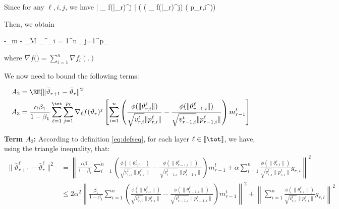 \documentclass{article}
\begin{document}
Since for any $\ell, i , j$, we have
\beq
  \EE{} \leq   \left| \nabla_{\ell} f(\bar{\vartheta}_r)^j \right| \left( \sign(  \nabla_{\ell} f(\bar{\vartheta}_r)^j) \neq  \sign( p_{r,i}^{\ell})\right) 
\eeq

Then, we obtain

\beq
\EE[A_1]  \leq -\alpha \phi_m     -  \alpha \phi_M \sum_{}^\tot \sum_{i = 1}^n \sum_{j=1}^{p_\ell} 
\eeq

where $\overline{\nabla f}(\dot) = \sum_{i=1}^n \nabla f_i(.)$

We now need to bound the following terms:

\begin{align}
& A_2 = \EE[  \| \bar{\vartheta}_{r+1} - \bar{\vartheta}_r \|^2]\\
& A_3 =  \frac{\alpha \beta_1}{1-\beta_1}  \sum_{\ell=1}^\tot \sum_{j=1}^{p_\ell} \nabla_{\ell} f(\bar{\vartheta}_r)^j \left[   \sum_{i = 1}^n  \left( \frac{\phi(\|\theta_{r,i}^{\ell}\|)}{\sqrt{v^{t}_{r,i}} \|p_{r,i}^{\ell}\|} - \frac{\phi(\|\theta_{r-1,i}^{\ell}\|)}{\sqrt{v^{t}_{r-1,i}} \|p_{r-1,i}^{\ell}\|} \right) m^{t}_{r-1}  \right]
\end{align}

\textbf{ Term $A_2$:}
According to definition \eqref{eq:defseq}, for each layer $\ell \in \llbracket \tot \rrbracket$, we have, using the triangle inequality, that:
\begin{align}
  \| \bar{\vartheta}^\ell_{r+1} - \bar{\vartheta}^\ell_r \|^2 & = \left\| \frac{\alpha \beta_1}{1-\beta_1}  \sum_{i = 1}^n  \left( \frac{\phi(\|\theta_{r,i}^{\ell}\|)}{\sqrt{v^{t}_{r,i}} \|p_{r,i}^{\ell}\|} - \frac{\phi(\|\theta_{r-1,i}^{\ell}\|)}{\sqrt{v^{t}_{r-1,i}} \|p_{r-1,i}^{\ell}\|} \right) m^{t}_{r-1} + \alpha \sum_{i = 1}^n \frac{\phi(\|\theta_{r,i}^{\ell}\|)}{\sqrt{v^{t}_{r,i}} \|p_{r,i}^{\ell}\|} g_{r,i}\right \|^2 \\
&  \leq 2\alpha^2 \left\| \frac{ \beta_1}{1-\beta_1}  \sum_{i = 1}^n  \left( \frac{\phi(\|\theta_{r,i}^{\ell}\|)}{\sqrt{v^{t}_{r,i}} \|p_{r,i}^{\ell}\|} - \frac{\phi(\|\theta_{r-1,i}^{\ell}\|)}{\sqrt{v^{t}_{r-1,i}} \|p_{r-1,i}^{\ell}\|} \right) m^{t}_{r-1}\right\|^2 + \left\| \sum_{i = 1}^n \frac{\phi(\|\theta_{r,i}^{\ell}\|)}{\sqrt{v^{t}_{r,i}} \|p_{r,i}^{\ell}\|} g_{r,i}\right\|^2
\end{align}
\end{document}
